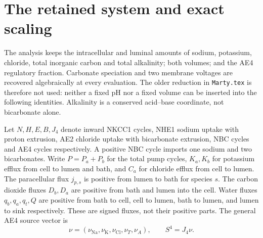 \section{The retained system and exact scaling}
\label{sec:exact-full-system}
The analysis keeps the intracellular and luminal amounts of sodium,
potassium, chloride, total inorganic carbon and total alkalinity; both
volumes; and the AE4 regulatory fraction.  Carbonate speciation and two
membrane voltages are recovered algebraically at every evaluation.
The older reduction in \texttt{Marty.tex} is therefore not used: neither a
fixed pH nor a fixed volume can be inserted into the following identities.
Alkalinity is a conserved acid--base coordinate, not bicarbonate alone.

Let $N,H,E,B,J_4$ denote inward NKCC1 cycles, NHE1 sodium uptake with proton
extrusion, AE2 chloride uptake with bicarbonate extrusion, NBC cycles and
AE4 cycles respectively.  A positive NBC cycle imports one sodium and two
bicarbonates.  Write $P=P_a+P_b$ for the total pump cycles,
$K_a,K_b$ for potassium efflux from cell to lumen and bath, and $C_a$ for
chloride efflux from cell to lumen.  The paracellular flux $j_{p,s}$ is
positive from lumen to bath for species $s$.  The carbon dioxide fluxes
$D_b,D_a$ are positive from bath and lumen into the cell.  Water fluxes
$q_b,q_a,q_t,Q$ are positive from bath to cell, cell to lumen, bath to lumen,
and lumen to sink respectively.  These are signed fluxes, not their positive
parts.  The general AE4 source vector is
\[
 \nu=(\nu_{\mathrm{Na}},\nu_{\mathrm K},\nu_{\mathrm{Cl}},\nu_T,\nu_A),
 \qquad S^4=J_4\nu .
\]

